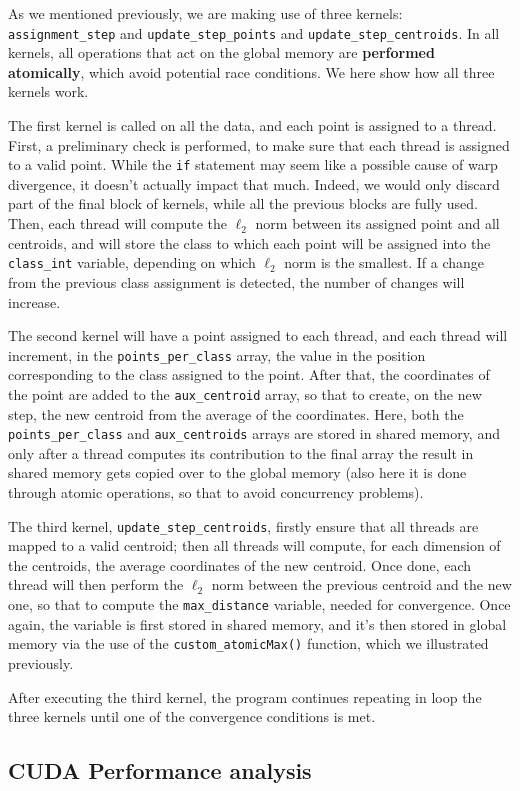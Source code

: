 \documentclass[11pt, journal]{IEEEtran}
\newcommand{\nwl}{

\vspace{11pt}

}
\begin{document}
As we mentioned previously, we are making use of three kernels: \verb|assignment_step| and \verb|update_step_points| and \verb|update_step_centroids|. In all kernels, all operations that act on the global memory are \textbf{performed atomically}, which avoid potential race conditions. We here show how all three kernels work.
\nwl
The first kernel is called on all the data, and each point is assigned to a thread. First, a preliminary check is performed, to make sure that each thread is assigned to a valid point. While the \verb|if| statement may seem like a possible cause of warp divergence, it doesn't actually impact that much. Indeed, we would only discard part of the final block of kernels, while all the previous blocks are fully used. Then, each thread will compute the $\ell_2$ norm between its assigned point and all centroids, and will store the class to which each point will be assigned into the \verb|class_int| variable, depending on which $\ell_2$ norm is the smallest. If a change from the previous class assignment is detected, the number of changes will increase.
\nwl
The second kernel will have a point assigned to each thread, and each thread will increment, in the \verb|points_per_class| array, the value in the position corresponding to the class assigned to the point. After that, the coordinates of the point are added to the \verb|aux_centroid| array, so that to create, on the new step, the new centroid from the average of the coordinates. Here, both the \verb|points_per_class| and \verb|aux_centroids| arrays are stored in shared memory, and only after a thread computes its contribution to the final array the result in shared memory gets copied over to the global memory (also here it is done through atomic operations, so that to avoid concurrency problems).
\nwl
The third kernel, \verb|update_step_centroids|, firstly ensure that all threads are mapped to a valid centroid; then all threads will compute, for each dimension of the centroids, the average coordinates of the new centroid. Once done, each thread will then perform the $\ell_2$ norm between the previous centroid and the new one, so that to compute the \verb|max_distance| variable, needed for convergence. Once again, the variable is first stored in shared memory, and it's then stored in global memory via the use of the \verb|custom_atomicMax()| function, which we illustrated previously.
\nwl
After executing the third kernel, the program continues repeating in loop the three kernels until one of the convergence conditions is met.

\subsection{CUDA Performance analysis}
\end{document}
